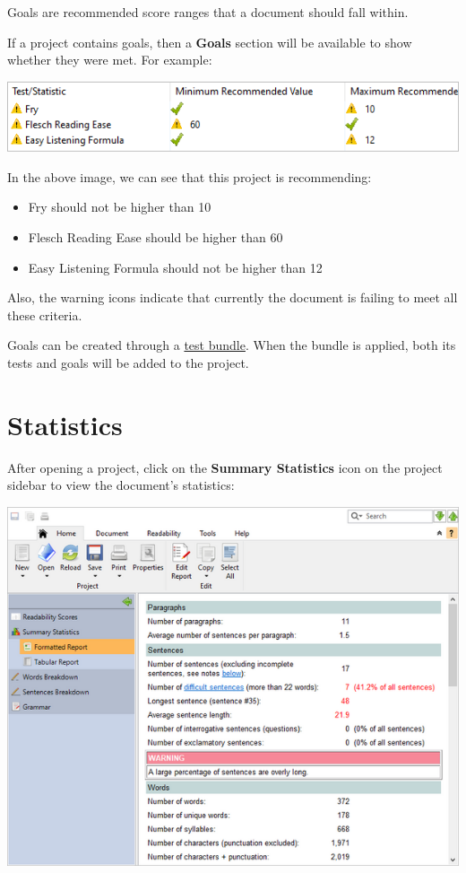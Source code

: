 \documentclass[
]{book}
\providecommand{\tightlist}{%
  \setlength{\itemsep}{0pt}\setlength{\parskip}{0pt}}
\theoremstyle{definition}
\theoremstyle{definition}
\theoremstyle{definition}
\theoremstyle{definition}
\theoremstyle{remark}
\begin{document}
Goals are recommended score ranges that a document should fall within.

If a project contains goals, then a \textbf{Goals} section will be available to show whether they were met. For example:

\begin{center}\includegraphics[width=0.75\linewidth,]{Images/StandardProjectGoals} \end{center}

In the above image, we can see that this project is recommending:

\begin{itemize}
\tightlist
\item
  Fry should not be higher than 10
\item
  Flesch Reading Ease should be higher than 60
\item
  Easy Listening Formula should not be higher than 12
\end{itemize}

Also, the warning icons indicate that currently the document is failing to meet all these criteria.

Goals can be created through a \protect\hyperlink{test-bundles}{test bundle}. When the bundle is applied, both its tests and goals will be added to the project.

\hypertarget{reviewing-statistics}{%
\section{Statistics}\label{reviewing-statistics}}

After opening a project, click on the \textbf{Summary Statistics} icon on the project sidebar to view the document's statistics:

\includegraphics{Images/featuresstats.png}
\end{document}
